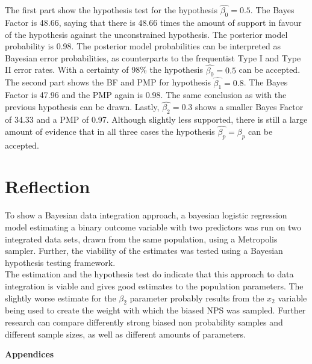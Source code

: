 \documentclass[10.5pt]{article}
\begin{document}
The first part show the hypothesis test for the hypothesis \(\hat{\beta_0} = 0.5\). The Bayes Factor is 48.66, saying that there is 48.66 times the amount of support in favour of the hypothesis against the unconstrained hypothesis. The posterior model probability is 0.98. The posterior model probabilities can be interpreted as Bayesian error probabilities, as counterparts to the frequentist Type I and Type II error rates. With a certainty of 98\% the hypothesis \(\hat{\beta_0} = 0.5\) can be accepted. The second part shows the BF and PMP for hypothesis \(\hat{\beta_1} = 0.8\). The Bayes Factor is 47.96 and the PMP again is 0.98. The same conclusion as with the previous hypothesis can be drawn. Lastly, \(\hat{\beta_2} = 0.3\) shows a smaller Bayes Factor of 34.33 and a PMP of 0.97. Although slightly less supported, there is still a large amount of evidence that in all three cases the hypothesis \(\hat{\beta_p} = \beta_p\) can be accepted.

\section{Reflection}
To show a Bayesian data integration approach, a bayesian logistic regression model estimating a binary outcome variable with two predictors was run on two integrated data sets, drawn from the same population, using a Metropolis sampler. Further, the viability of the estimates was tested using a Bayesian hypothesis testing framework. \\
The estimation and the hypothesis test do indicate that this approach to data integration is viable and gives good estimates to the population parameters. The slightly worse estimate for the \(\beta_2\) parameter probably results from the \(x_2\) variable being used to create the weight with which the biased NPS was sampled. Further research can compare differently strong biased non probability samples and different sample sizes, as well as different amounts of parameters.



\newpage




\newpage

\pagestyle{fancyplain}
\vspace*{\fill}
     \begin{center}
          \bf{\Huge{Appendices}}
     \end{center}
\vspace*{\fill}
\thispagestyle{fancy}

\makeatletter
\def\@makechapterhead#1{%
  \vspace*{30\p@}%
  {\noindent\LARGE\bf APPENDIX\ \thechapter \hspace*{0.5cm} \parindent \z@ \raggedright \normalfont
    \interlinepenalty\@M
    \LARGE \bfseries #1\par\nobreak
    \vskip 30\p@
  }}
  \makeatother
  
\appendix
\thispagestyle{empty}
\end{document}
